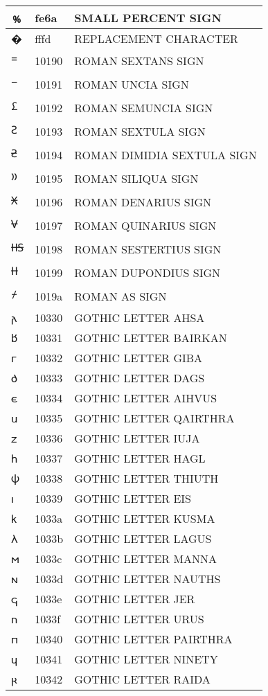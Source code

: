 \documentclass[12pt,letterpaper,openany]{book}
\begin{document}
\begin{center}
\begin{supertabular}{|m{0.25in}|m{0.5in}|m{4in}|}
			﹪ & fe6a & SMALL PERCENT SIGN\\\hline
			� & fffd & REPLACEMENT CHARACTER\\\hline
			𐆐 & 10190 & ROMAN SEXTANS SIGN\\\hline
			𐆑 & 10191 & ROMAN UNCIA SIGN\\\hline
			𐆒 & 10192 & ROMAN SEMUNCIA SIGN\\\hline
			𐆓 & 10193 & ROMAN SEXTULA SIGN\\\hline
			𐆔 & 10194 & ROMAN DIMIDIA SEXTULA SIGN\\\hline
			𐆕 & 10195 & ROMAN SILIQUA SIGN\\\hline
			𐆖 & 10196 & ROMAN DENARIUS SIGN\\\hline
			𐆗 & 10197 & ROMAN QUINARIUS SIGN\\\hline
			𐆘 & 10198 & ROMAN SESTERTIUS SIGN\\\hline
			𐆙 & 10199 & ROMAN DUPONDIUS SIGN\\\hline
			𐆚 & 1019a & ROMAN AS SIGN\\\hline
			𐌰 & 10330 & GOTHIC LETTER AHSA\\\hline
			𐌱 & 10331 & GOTHIC LETTER BAIRKAN\\\hline
			𐌲 & 10332 & GOTHIC LETTER GIBA\\\hline
			𐌳 & 10333 & GOTHIC LETTER DAGS\\\hline
			𐌴 & 10334 & GOTHIC LETTER AIHVUS\\\hline
			𐌵 & 10335 & GOTHIC LETTER QAIRTHRA\\\hline
			𐌶 & 10336 & GOTHIC LETTER IUJA\\\hline
			𐌷 & 10337 & GOTHIC LETTER HAGL\\\hline
			𐌸 & 10338 & GOTHIC LETTER THIUTH\\\hline
			𐌹 & 10339 & GOTHIC LETTER EIS\\\hline
			𐌺 & 1033a & GOTHIC LETTER KUSMA\\\hline
			𐌻 & 1033b & GOTHIC LETTER LAGUS\\\hline
			𐌼 & 1033c & GOTHIC LETTER MANNA\\\hline
			𐌽 & 1033d & GOTHIC LETTER NAUTHS\\\hline
			𐌾 & 1033e & GOTHIC LETTER JER\\\hline
			𐌿 & 1033f & GOTHIC LETTER URUS\\\hline
			𐍀 & 10340 & GOTHIC LETTER PAIRTHRA\\\hline
			𐍁 & 10341 & GOTHIC LETTER NINETY\\\hline
			𐍂 & 10342 & GOTHIC LETTER RAIDA\\\hline

\end{supertabular}
\end{center}
\end{document}
